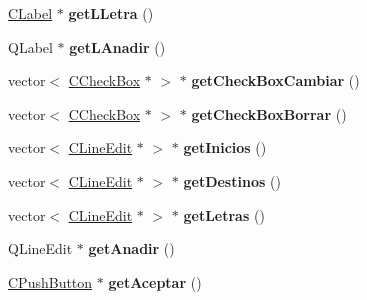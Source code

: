 \begin{DoxyCompactItemize}
\item 
\hyperlink{classCLabel}{C\+Label} $\ast$ {\bfseries get\+L\+Letra} ()\hypertarget{classCAsistenteCodificacion_adf8377459fe4ec5cf0a963fd9282420e}{}\label{classCAsistenteCodificacion_adf8377459fe4ec5cf0a963fd9282420e}

\item 
Q\+Label $\ast$ {\bfseries get\+L\+Anadir} ()\hypertarget{classCAsistenteCodificacion_a7cdb8dcc5d3027177721fc628e3c53ae}{}\label{classCAsistenteCodificacion_a7cdb8dcc5d3027177721fc628e3c53ae}

\item 
vector$<$ \hyperlink{classCCheckBox}{C\+Check\+Box} $\ast$ $>$ $\ast$ {\bfseries get\+Check\+Box\+Cambiar} ()\hypertarget{classCAsistenteCodificacion_af5c7ebbcf38b72cb912ccec2c4309323}{}\label{classCAsistenteCodificacion_af5c7ebbcf38b72cb912ccec2c4309323}

\item 
vector$<$ \hyperlink{classCCheckBox}{C\+Check\+Box} $\ast$ $>$ $\ast$ {\bfseries get\+Check\+Box\+Borrar} ()\hypertarget{classCAsistenteCodificacion_aba95e5e21d3f5cccad79139fc7ffbe7e}{}\label{classCAsistenteCodificacion_aba95e5e21d3f5cccad79139fc7ffbe7e}

\item 
vector$<$ \hyperlink{classCLineEdit}{C\+Line\+Edit} $\ast$ $>$ $\ast$ {\bfseries get\+Inicios} ()\hypertarget{classCAsistenteCodificacion_a6e18515302506ef6766a5a4bdbb64dfd}{}\label{classCAsistenteCodificacion_a6e18515302506ef6766a5a4bdbb64dfd}

\item 
vector$<$ \hyperlink{classCLineEdit}{C\+Line\+Edit} $\ast$ $>$ $\ast$ {\bfseries get\+Destinos} ()\hypertarget{classCAsistenteCodificacion_a8e55263b52df54df6353f6a2ae4a88df}{}\label{classCAsistenteCodificacion_a8e55263b52df54df6353f6a2ae4a88df}

\item 
vector$<$ \hyperlink{classCLineEdit}{C\+Line\+Edit} $\ast$ $>$ $\ast$ {\bfseries get\+Letras} ()\hypertarget{classCAsistenteCodificacion_ae4e5d1b2a9830a026897bed772bfb49e}{}\label{classCAsistenteCodificacion_ae4e5d1b2a9830a026897bed772bfb49e}

\item 
Q\+Line\+Edit $\ast$ {\bfseries get\+Anadir} ()\hypertarget{classCAsistenteCodificacion_a7714a288c08739425ed8cd4d927451e6}{}\label{classCAsistenteCodificacion_a7714a288c08739425ed8cd4d927451e6}

\item 
\hyperlink{classCPushButton}{C\+Push\+Button} $\ast$ {\bfseries get\+Aceptar} ()\hypertarget{classCAsistenteCodificacion_ac8253a5adbe02d45daf20afe4d7678f2}{}\label{classCAsistenteCodificacion_ac8253a5adbe02d45daf20afe4d7678f2}


\end{DoxyCompactItemize}
